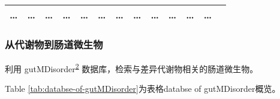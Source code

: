 \documentclass[
]{article}
\begin{document}
\begin{longtable}[]{@{}lllllllllllll@{}}
\begin{minipage}[t]{0.05\columnwidth}
\ldots{}\strut
\end{minipage} & \begin{minipage}[t]{0.05\columnwidth}\raggedright
\ldots{}\strut
\end{minipage} & \begin{minipage}[t]{0.05\columnwidth}\raggedright
\ldots{}\strut
\end{minipage} & \begin{minipage}[t]{0.05\columnwidth}\raggedright
\ldots{}\strut
\end{minipage} & \begin{minipage}[t]{0.07\columnwidth}\raggedright
\ldots{}\strut
\end{minipage} & \begin{minipage}[t]{0.07\columnwidth}\raggedright
\ldots{}\strut
\end{minipage} & \begin{minipage}[t]{0.05\columnwidth}\raggedright
\ldots{}\strut
\end{minipage} & \begin{minipage}[t]{0.04\columnwidth}\raggedright
\ldots{}\strut
\end{minipage} & \begin{minipage}[t]{0.05\columnwidth}\raggedright
\ldots{}\strut
\end{minipage} & \begin{minipage}[t]{0.05\columnwidth}\raggedright
\ldots{}\strut
\end{minipage} & \begin{minipage}[t]{0.05\columnwidth}\raggedright
\ldots{}\strut
\end{minipage} & \begin{minipage}[t]{0.02\columnwidth}\raggedright
\ldots{}\strut
\end{minipage}\tabularnewline
\bottomrule
\end{longtable}

\hypertarget{ux4eceux4ee3ux8c22ux7269ux5230ux80a0ux9053ux5faeux751fux7269}{%
\subsubsection{从代谢物到肠道微生物}\label{ux4eceux4ee3ux8c22ux7269ux5230ux80a0ux9053ux5faeux751fux7269}}

利用 gutMDisorder\textsuperscript{\protect\hyperlink{ref-GutmdisorderACheng2019}{2}} 数据库，检索与差异代谢物相关的肠道微生物。

Table \ref{tab:databse-of-gutMDisorder}为表格databse of gutMDisorder概览。
\end{document}
